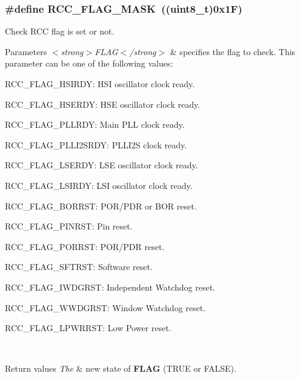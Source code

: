 \subsubsection[{\texorpdfstring{R\+C\+C\+\_\+\+F\+L\+A\+G\+\_\+\+M\+A\+SK}{RCC_FLAG_MASK}}]{\setlength{\rightskip}{0pt plus 5cm}\#define R\+C\+C\+\_\+\+F\+L\+A\+G\+\_\+\+M\+A\+SK~((uint8\+\_\+t)0x1\+F)}\hypertarget{group___r_c_c___flags___interrupts___management_ga80017c6bf8a5c6f53a1a21bb8db93a82}{}\label{group___r_c_c___flags___interrupts___management_ga80017c6bf8a5c6f53a1a21bb8db93a82}


Check R\+CC flag is set or not. 


\begin{DoxyParams}{Parameters}
{\em $<$strong$>$\+F\+L\+A\+G$<$/strong$>$} & specifies the flag to check. This parameter can be one of the following values\+: \begin{DoxyItemize}
\item R\+C\+C\+\_\+\+F\+L\+A\+G\+\_\+\+H\+S\+I\+R\+DY\+: H\+SI oscillator clock ready. \item R\+C\+C\+\_\+\+F\+L\+A\+G\+\_\+\+H\+S\+E\+R\+DY\+: H\+SE oscillator clock ready. \item R\+C\+C\+\_\+\+F\+L\+A\+G\+\_\+\+P\+L\+L\+R\+DY\+: Main P\+LL clock ready. \item R\+C\+C\+\_\+\+F\+L\+A\+G\+\_\+\+P\+L\+L\+I2\+S\+R\+DY\+: P\+L\+L\+I2S clock ready. \item R\+C\+C\+\_\+\+F\+L\+A\+G\+\_\+\+L\+S\+E\+R\+DY\+: L\+SE oscillator clock ready. \item R\+C\+C\+\_\+\+F\+L\+A\+G\+\_\+\+L\+S\+I\+R\+DY\+: L\+SI oscillator clock ready. \item R\+C\+C\+\_\+\+F\+L\+A\+G\+\_\+\+B\+O\+R\+R\+ST\+: P\+O\+R/\+P\+DR or B\+OR reset. \item R\+C\+C\+\_\+\+F\+L\+A\+G\+\_\+\+P\+I\+N\+R\+ST\+: Pin reset. \item R\+C\+C\+\_\+\+F\+L\+A\+G\+\_\+\+P\+O\+R\+R\+ST\+: P\+O\+R/\+P\+DR reset. \item R\+C\+C\+\_\+\+F\+L\+A\+G\+\_\+\+S\+F\+T\+R\+ST\+: Software reset. \item R\+C\+C\+\_\+\+F\+L\+A\+G\+\_\+\+I\+W\+D\+G\+R\+ST\+: Independent Watchdog reset. \item R\+C\+C\+\_\+\+F\+L\+A\+G\+\_\+\+W\+W\+D\+G\+R\+ST\+: Window Watchdog reset. \item R\+C\+C\+\_\+\+F\+L\+A\+G\+\_\+\+L\+P\+W\+R\+R\+ST\+: Low Power reset. \end{DoxyItemize}
\\
\hline
\end{DoxyParams}

\begin{DoxyRetVals}{Return values}
{\em The} & new state of {\bfseries F\+L\+AG} (T\+R\+UE or F\+A\+L\+SE). \\
\hline
\end{DoxyRetVals}
